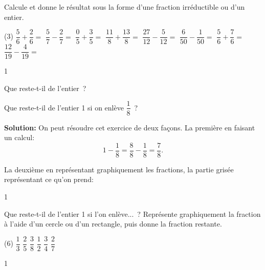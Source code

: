 \documentclass[a4paper,11pt]{report}
\begin{document}
\begin{exo}
{Calcule et donne le résultat sous la forme d'une fraction irréductible ou d'un entier. 
	\begin{tasks}[after-skip=-1em](3)
\task $\dfrac{5}{6}+\dfrac{2}{6}= $ 
 \task $\dfrac{5}{7}-\dfrac{2}{7}=$ 
 \task $\dfrac{0}{5}+\dfrac{3}{5}=$
 \task $\dfrac{11}{8}+\dfrac{13}{8}=$
 \task $\dfrac{27}{12}-\dfrac{5}{12}=$
 \task $\dfrac{6}{50}-\dfrac{1}{50}=$
 \task $\dfrac{5}{6}+\dfrac{7}{6}=$
 \task $\dfrac{12}{19}-\dfrac{4}{19}=$\\ 
\end{tasks}
}{1}
\end{exo}



\begin{resolu}{Que reste-t-il de l'entier~?}{

Que reste-t-il de l'entier 1 si on enlève $\dfrac{1}{8}$~?

{\bfseries Solution:} On peut résoudre cet exercice de deux façons. La première en faisant un calcul:
\[1-\dfrac{1}{8}=\dfrac{8}{8}-\dfrac{1}{8}=\dfrac{7}{8}.\]

La deuxième en représentant graphiquement les fractions, la partie grisée représentant ce qu'on prend:
\begin{center}
\end{center}
}
{1}
\end{resolu}

\begin{exo}
{Que reste-t-il de l'entier 1 si l'on enlève...~?
Représente graphiquement la fraction à l'aide d'un cercle ou d'un rectangle, puis donne la fraction restante.

\begin{tasks}[after-skip=-0.5em](6)
\task $\dfrac{1}{3}$
\task $\dfrac{2}{5}$
\task $\dfrac{3}{8}$
\task $\dfrac{1}{2}$
\task $\dfrac{3}{4}$
\task $\dfrac{2}{7}$
\end{tasks}}
{1}
\end{exo}
\end{document}
